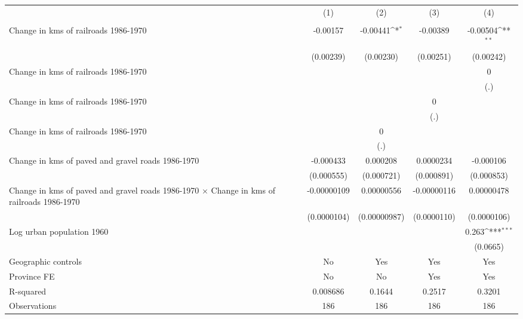 {
\def\sym#1{\ifmmode^{#1}\else\(^{#1}\)\fi}
\begin{tabular}{l*{4}{c}}
\hline\hline
                &\multicolumn{1}{c}{(1)}&\multicolumn{1}{c}{(2)}&\multicolumn{1}{c}{(3)}&\multicolumn{1}{c}{(4)}\\
                &\multicolumn{1}{c}{}&\multicolumn{1}{c}{}&\multicolumn{1}{c}{}&\multicolumn{1}{c}{}\\
\hline
Change in kms of railroads 1986-1970& -0.00157         & -0.00441\sym{*}  & -0.00389         & -0.00504\sym{**} \\
                &(0.00239)         &(0.00230)         &(0.00251)         &(0.00242)         \\
[1em]
Change in kms of railroads 1986-1970&                  &                  &                  &        0         \\
                &                  &                  &                  &      (.)         \\
[1em]
Change in kms of railroads 1986-1970&                  &                  &        0         &                  \\
                &                  &                  &      (.)         &                  \\
[1em]
Change in kms of railroads 1986-1970&                  &        0         &                  &                  \\
                &                  &      (.)         &                  &                  \\
[1em]
Change in kms of paved and gravel roads 1986-1970&-0.000433         & 0.000208         &0.0000234         &-0.000106         \\
                &(0.000555)         &(0.000721)         &(0.000891)         &(0.000853)         \\
[1em]
Change in kms of paved and gravel roads 1986-1970 $\times$ Change in kms of railroads 1986-1970&-0.00000109         &0.00000556         &-0.00000116         &0.00000478         \\
                &(0.0000104)         &(0.00000987)         &(0.0000110)         &(0.0000106)         \\
[1em]
Log urban population 1960&                  &                  &                  &    0.263\sym{***}\\
                &                  &                  &                  & (0.0665)         \\
\hline
Geographic controls&       No         &      Yes         &      Yes         &      Yes         \\
Province FE     &       No         &       No         &      Yes         &      Yes         \\
R-squared       & 0.008686         &   0.1644         &   0.2517         &   0.3201         \\
Observations    &      186         &      186         &      186         &      186         \\
\hline\hline
\end{tabular}
}
